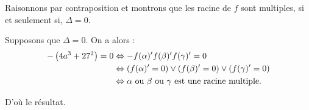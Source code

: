 \begin{demonstration}[Lemme]
Raisonnons par contraposition et montrons que les racine de $f$ sont multiples, si et
seulement si, $\Delta = 0$. 

Supposons que $\Delta = 0$. On a alors :
 \begin{align*}
     - \left( 4a^3 + 27^2 \right) = 0 &\Leftrightarrow - f(\alpha)' f(\beta )' f(\gamma)' = 0 \\
                                      & \Leftrightarrow \left( f(\alpha)' = 0 \right) \vee \left( f(\beta )' = 0 \right) \vee \left( f(\gamma)' = 0 \right) \\
                                      &\Leftrightarrow \alpha \text{ ou } \beta \text{ ou } \gamma \text{ est une racine multiple}
.\end{align*}

D'où le résultat.
\end{demonstration}











